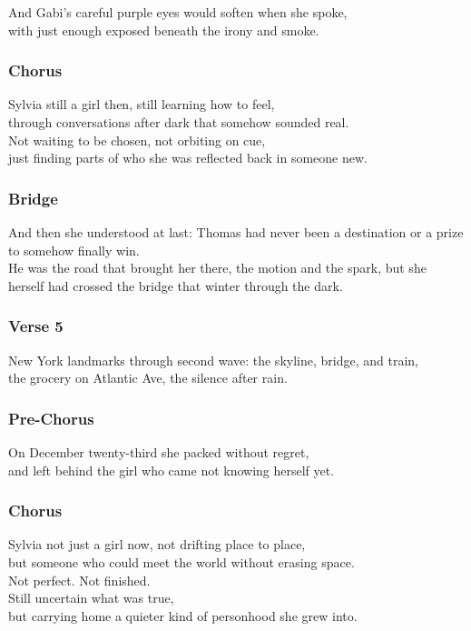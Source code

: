 And Gabi's careful purple eyes would soften when she spoke,\\
with just enough exposed beneath the irony and smoke.

\subsubsection{Chorus}\label{chorus-31}

Sylvia still a girl then, still learning how to feel,\\
through conversations after dark that somehow sounded real.\\
Not waiting to be chosen, not orbiting on cue,\\
just finding parts of who she was reflected back in someone new.

\subsubsection{Bridge}\label{bridge-9}

And then she understood at last: Thomas had never been a destination or
a prize to somehow finally win.\\
He was the road that brought her there, the motion and the spark, but
she herself had crossed the bridge that winter through the dark.

\subsubsection{Verse 5}\label{verse-5}

New York landmarks through second wave: the skyline, bridge, and
train,\\
the grocery on Atlantic Ave, the silence after rain.

\subsubsection{Pre-Chorus}\label{pre-chorus-22}

On December twenty-third she packed without regret,\\
and left behind the girl who came not knowing herself yet.

\subsubsection{Chorus}\label{chorus-32}

Sylvia not just a girl now, not drifting place to place,\\
but someone who could meet the world without erasing space.\\
Not perfect. Not finished.\\
Still uncertain what was true,\\
but carrying home a quieter kind of personhood she grew into.


